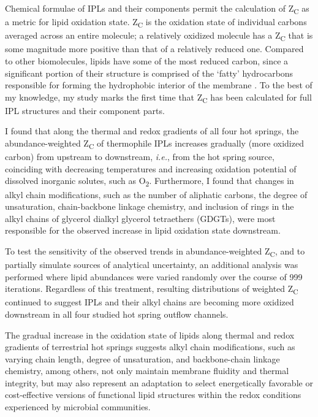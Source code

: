 Chemical formulae of IPLs and their components permit the calculation of Z\textsubscript{C} as a metric for lipid oxidation state. Z\textsubscript{C} is the oxidation state of individual carbons averaged across an entire molecule;  a relatively oxidized molecule has a Z\textsubscript{C} that is some magnitude more positive than that of a relatively reduced one. Compared to other biomolecules, lipids have some of the most reduced carbon, since a significant portion of their structure is comprised of the `fatty' hydrocarbons responsible for forming the hydrophobic interior of the membrane \citep{likens2010biogeochemistry}. To the best of my knowledge, my study marks the first time that Z\textsubscript{C} has been calculated for full IPL structures and their component parts.

I found that along the thermal and redox gradients of all four hot springs, the abundance-weighted Z\textsubscript{C} of thermophile IPLs increases gradually (more oxidized carbon) from upstream to downstream, \textit{i.e.}, from the hot spring source, coinciding with decreasing temperatures and increasing oxidation potential of dissolved inorganic solutes, such as O\textsubscript{2}. Furthermore, I found that changes in alkyl chain modifications, such as the number of aliphatic carbons, the degree of unsaturation, chain-backbone linkage chemistry, and inclusion of rings in the alkyl chains of glycerol dialkyl glycerol tetraethers (GDGTs), were most responsible for the observed increase in lipid oxidation state downstream.

To test the sensitivity of the observed trends in abundance-weighted Z\textsubscript{C}, and to partially simulate sources of analytical uncertainty, an additional analysis was performed where lipid abundances were varied randomly over the course of 999 iterations. Regardless of this treatment, resulting distributions of weighted Z\textsubscript{C} continued to suggest IPLs and their alkyl chains are becoming more oxidized downstream in all four studied hot spring outflow channels.

The gradual increase in the oxidation state of lipids along thermal and redox gradients of terrestrial hot springs suggests alkyl chain modifications, such as varying chain length, degree of unsaturation, and backbone-chain linkage chemistry, among others, not only maintain membrane fluidity and thermal integrity, but may also represent an adaptation to select energetically favorable or cost-effective versions of functional lipid structures within the redox conditions experienced by microbial communities.




